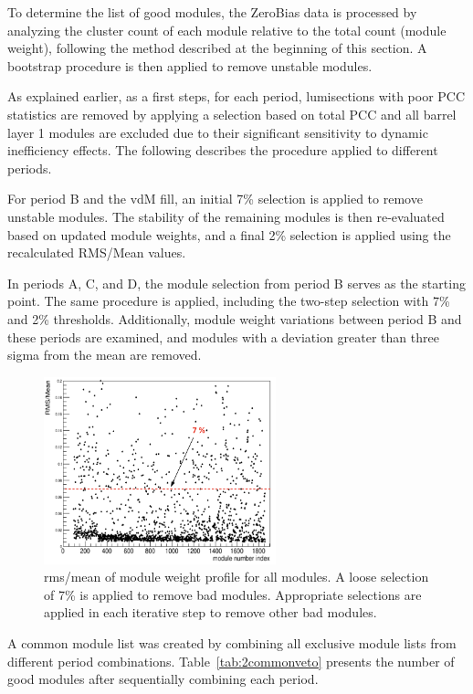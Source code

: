 To determine the list of good modules, the ZeroBias data is processed by analyzing the cluster count of each module relative to the total count (module weight), following the method described at the beginning of this section. A bootstrap procedure is then applied to remove unstable modules.

As explained earlier, as a first steps, for each period, lumisections with poor PCC statistics are removed by applying a selection based on total PCC and all barrel layer 1 modules are excluded due to their significant sensitivity to dynamic inefficiency effects. The following describes the procedure applied to different periods.

For period B and the vdM fill, an initial 7\% selection is applied to remove unstable modules. The stability of the remaining modules is then re-evaluated based on updated module weights, and a final 2\% selection is applied using the recalculated RMS/Mean values.

In periods A, C, and D, the module selection from period B serves as the starting point. The same procedure is applied, including the two-step selection with 7\% and 2\% thresholds. Additionally, module weight variations between period B and these periods are examined, and modules with a deviation greater than three sigma from the mean are removed.

\begin{figure}[h]
    \centering
    \includegraphics[width=0.6\textwidth]{Chapter4/module_selection/RMSmean.png}
    \caption{rms/mean of module weight profile for all modules. A loose selection of 7\% is applied to remove bad modules. Appropriate selections are applied in each iterative step to remove other bad modules.}
    \label{fig:outliermodules}
\end{figure}


A common module list was created by combining all exclusive module lists from different period combinations. Table~\ref{tab:2commonveto} presents the number of good modules after sequentially combining each period.

